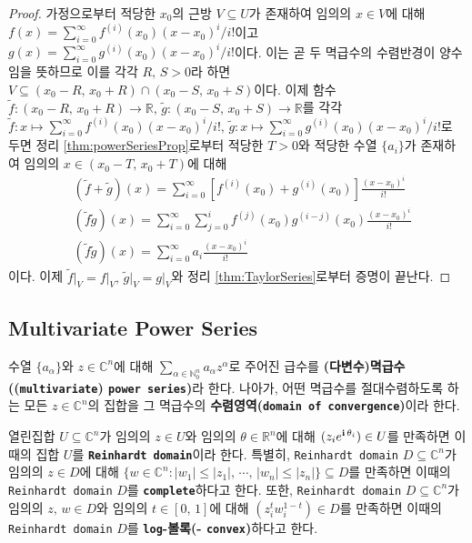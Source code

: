\begin{proof}
    가정으로부터 적당한 $x_0$의 근방 $V\subseteq U$가 존재하여 임의의 $x\in V$에 대해 $f(x)=\sum_{i=0}^\infty f^{(i)}(x_0)(x-x_0)^i/i!$이고 $g(x)=\sum_{i=0}^\infty g^{(i)}(x_0)(x-x_0)^i/i!$이다. 이는 곧 두 멱급수의 수렴반경이 양수임을 뜻하므로 이를 각각 $R,\,S>0$라 하면 $V\subseteq(x_0-R,\,x_0+R)\cap(x_0-S,\,x_0+S)$이다. 이제 함수 $\widetilde{f}:(x_0-R,\,x_0+R)\to\mathbb{R},\,\widetilde{g}:(x_0-S,\,x_0+S)\to\mathbb{R}$를 각각 $\widetilde{f}:x\mapsto\sum_{i=0}^\infty f^{(i)}(x_0)(x-x_0)^i/i!,\,\widetilde{g}:x\mapsto\sum_{i=0}^\infty g^{(i)}(x_0)(x-x_0)^i/i!$로 두면 정리 \ref{thm:powerSeriesProp}로부터 적당한 $T>0$와 적당한 수열 $\{a_i\}$가 존재하여 임의의 $x\in(x_0-T,\,x_0+T)$에 대해
    \begin{align*}
        &(\widetilde{f}+\widetilde{g})(x)=\sum_{i=0}^\infty[f^{(i)}(x_0)+g^{(i)}(x_0)]\frac{(x-x_0)^i}{i!}\\
        &(\widetilde{f}\widetilde{g})(x)=\sum_{i=0}^\infty\sum_{j=0}^if^{(j)}(x_0)g^{(i-j)}(x_0)\frac{(x-x_0)^i}{i!}\\
        &(\widetilde{f}\widetilde{g})(x)=\sum_{i=0}^\infty a_i\frac{(x-x_0)^i}{i!}
    \end{align*}
    이다. 이제 $\widetilde{f}\vert_V=f\vert_V,\,\widetilde{g}\vert_V=g\vert_V$와 정리 \ref{thm:TaylorSeries}로부터 증명이 끝난다.
\end{proof}

\subsection{Multivariate Power Series}

\begin{definition}
    수열 $\{a_\alpha\}$와 $z\in\mathbb{C}^n$에 대해 $\sum_{\alpha\in\mathbb{N}_0^n}a_\alpha z^\alpha$로 주어진 급수를 \textbf{(다변수)멱급수((\texttt{multivariate}) \texttt{power series})}라 한다. 나아가, 어떤 멱급수를 절대수렴하도록 하는 모든 $z\in\mathbb{C}^n$의 집합을 그 멱급수의 \textbf{수렴영역(\texttt{domain of convergence})}이라 한다.
\end{definition}

\begin{definition}
    열린집합 $U\subseteq\mathbb{C}^n$가 임의의 $z\in U$와 임의의 $\theta\in\mathbb{R}^n$에 대해 $(z_ie^{\mathbf{i}\,\theta_i})\in U$를 만족하면 이때의 집합 $U$를 \textbf{\texttt{Reinhardt domain}}이라 한다. 특별히, \texttt{Reinhardt domain} $D\subseteq\mathbb{C}^n$가 임의의 $z\in D$에 대해 $\{w\in\mathbb{C}^n:|w_1|\leq|z_1|,\,\cdots,\,|w_n|\leq|z_n|\}\subseteq D$를 만족하면 이때의 \texttt{Reinhardt domain} $D$를 \texttt{\textbf{complete}}하다고 한다. 또한, \texttt{Reinhardt domain} $D\subseteq\mathbb{C}^n$가 임의의 $z,\,w\in D$와 임의의 $t\in[0,\,1]$에 대해 $(z_i^tw_i^{1-t})\in D$를 만족하면 이때의 \texttt{Reinhardt domain} $D$를 \textbf{\texttt{log}-볼록(- \texttt{convex})}하다고 한다.
\end{definition}

